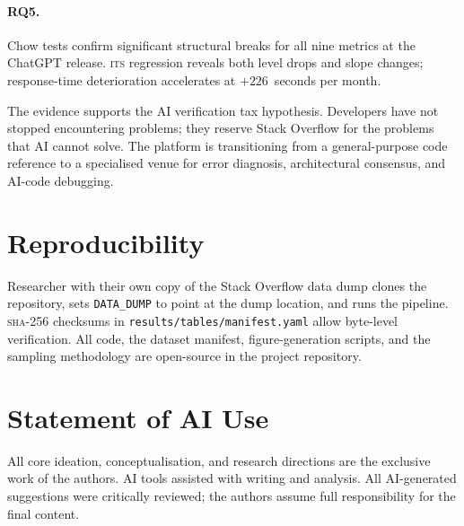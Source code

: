 \documentclass[sigconf]{acmart}
\begin{document}
\paragraph{RQ5.}
Chow tests confirm significant
structural breaks
for all nine metrics at the ChatGPT release.
\textsc{its} regression reveals
both level drops and slope changes;
response-time deterioration accelerates
at $+226$~seconds per month.

The evidence supports
the AI verification tax hypothesis.
Developers have not stopped
encountering problems;
they reserve Stack Overflow
for the problems that AI cannot solve.
The platform is transitioning
from a general-purpose code reference
to a specialised venue
for error diagnosis,
architectural consensus,
and AI-code debugging.

\section{Reproducibility}
\label{sec:reproducibility}

Researcher with their own copy
of the Stack Overflow data dump
clones the repository,
sets \texttt{DATA\_DUMP} to point
at the dump location,
and runs the pipeline.
\textsc{sha}-256 checksums in
\texttt{results/tables/manifest.yaml}
allow byte-level verification.
All code, the dataset manifest,
figure-generation scripts,
and the sampling methodology
are open-source in the project repository.

\balance
\section{Statement of AI Use}
All core ideation, conceptualisation,
and research directions
are the exclusive work of the authors.
AI tools assisted with writing
and analysis.
All AI-generated suggestions were
critically reviewed;
the authors assume full responsibility
for the final content.



\end{document}
